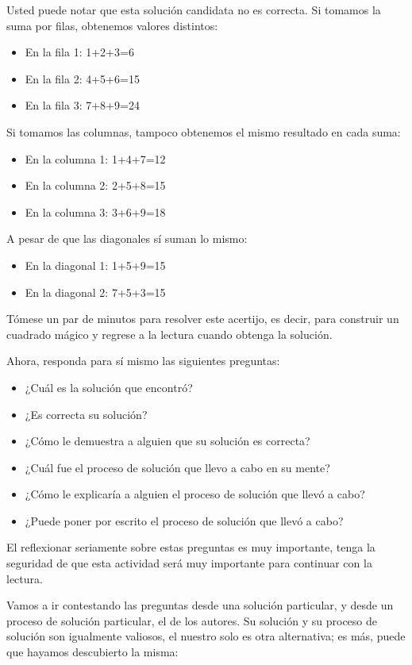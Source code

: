 Usted puede notar que esta solución candidata no es correcta. Si tomamos
la suma por filas, obtenemos valores distintos:
\begin{itemize}
\item En la fila 1: 1+2+3=6 
\item En la fila 2: 4+5+6=15 
\item En la fila 3: 7+8+9=24
\end{itemize}
Si tomamos las columnas, tampoco obtenemos el mismo resultado en cada
suma:
\begin{itemize}
\item En la columna 1: 1+4+7=12 
\item En la columna 2: 2+5+8=15 
\item En la columna 3: 3+6+9=18
\end{itemize}
A pesar de que las diagonales sí suman lo mismo:
\begin{itemize}
\item En la diagonal 1: 1+5+9=15 
\item En la diagonal 2: 7+5+3=15
\end{itemize}
Tómese un par de minutos para resolver este acertijo, es decir, para
construir un cuadrado mágico y regrese a la lectura cuando obtenga
la solución.

Ahora, responda para sí mismo las siguientes preguntas:
\begin{itemize}
\item ¿Cuál es la solución que encontró? 
\item ¿Es correcta su solución? 
\item ¿Cómo le demuestra a alguien que su solución es correcta? 
\item ¿Cuál fue el proceso de solución que llevo a cabo en su mente? 
\item ¿Cómo le explicaría a alguien el proceso de solución que llevó a cabo? 
\item ¿Puede poner por escrito el proceso de solución que llevó a cabo? 
\end{itemize}
El reflexionar seriamente sobre estas preguntas es muy importante,
tenga la seguridad de que esta actividad será muy importante para
continuar con la lectura.

Vamos a ir contestando las preguntas desde una solución particular,
y desde un proceso de solución particular, el de los autores. Su solución
y su proceso de solución son igualmente valiosos, el nuestro solo
es otra alternativa; es más, puede que hayamos descubierto la misma:

